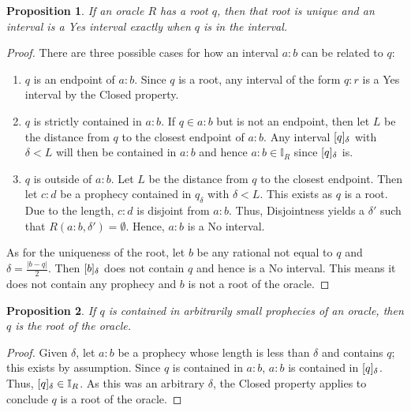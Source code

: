 \documentclass[12pt]{article}
\newtheorem{proposition}{Proposition}[section]
\begin{document}
\begin{proposition}\label{os:singular}
    If an oracle $R$ has a root $q$, then that root is unique and an interval is a Yes interval exactly when $q$ is in the interval.
\end{proposition}

\begin{proof}
    There are three possible cases for how an interval $a:b$ can be related to $q$:

    \begin{enumerate}
        \item $q$ is an endpoint of $a:b$. Since $q$ is a root, any interval of the form $q:r$ is a Yes interval by the Closed property.
        \item $q$ is strictly contained in $a:b$. If $q \in a:b$ but is not an endpoint, then let $L$ be the distance from $q$ to the closest endpoint of $a:b$. Any interval $[q]_{\delta}$ with $\delta < L $ will then be contained in $a:b$ and hence $a:b \in \mathbb{I}_R$ since $[q]_{\delta}$ is. 
        \item $q$ is outside of $a:b$.  Let $L$ be the distance from $q$ to the closest endpoint. Then let $c:d$ be a prophecy contained in $q_{\delta}$ with $\delta < L$. This exists as $q$ is a root. Due to the length, $c:d$ is disjoint from $a:b$. Thus, Disjointness yields a $\delta'$ such that $R(a:b, \delta')= \emptyset$. Hence, $a:b$ is a No interval. 
    \end{enumerate}
    
    As for the uniqueness of the root, let $b$ be any rational not equal to $q$ and $\delta = \frac{|b-q|}{2}$. Then $[b]_{\delta}$ does not contain $q$ and hence is a No interval. This means it does not contain any prophecy and $b$ is not a root of the oracle. 
\end{proof}


\begin{proposition}\label{os:rootsmallpro}
    If $q$ is contained in arbitrarily small prophecies of an oracle, then $q$ is the root of the oracle. 
\end{proposition}

\begin{proof}
    Given $\delta$, let $a:b$ be a prophecy whose length is less than $\delta$ and contains $q$; this exists by assumption. Since $q$ is contained in $a:b$, $a:b$ is contained in $[q]_{\delta}$. Thus, $[q]_{\delta} \in \mathbb{I}_R$. As this was an arbitrary $\delta$, the Closed property applies to conclude  $q$ is a root of the oracle. 
\end{proof}
\end{document}
